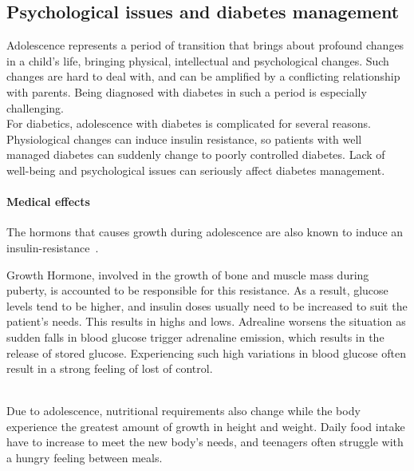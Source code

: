 \subsection{Psychological issues and diabetes management}

Adolescence represents a period of transition that brings about %
profound changes in a child's life, bringing physical, intellectual and psychological changes. Such changes are hard to deal with, and can be amplified by a conflicting relationship with parents. Being diagnosed with diabetes in such a period is especially challenging.
\\
For diabetics, adolescence with diabetes is complicated for several reasons. Physiological changes can induce insulin resistance, so patients with well managed diabetes can suddenly change to poorly controlled diabetes. Lack of well-being and psychological issues can seriously affect diabetes management. 
\\
\paragraph{Medical effects}
The hormons that causes growth during adolescence are also known to induce an insulin-resistance~\cite{HelpChildTeenTD1}.


Growth Hormone, involved in the growth of bone and muscle mass during puberty, is accounted to be responsible for this resistance. As a result, glucose levels tend to be higher, and insulin doses usually need to be increased to suit the patient's needs. 
This results in highs and lows. Adrealine worsens the situation as sudden falls in blood glucose trigger adrenaline emission, which results in the release of stored glucose. 
Experiencing such high variations in blood glucose often result in a strong feeling of lost of control.

\\
Due to adolescence, nutritional requirements also change while the body experience the greatest amount of growth in height and weight. Daily food intake have to increase to meet the new body's needs, and teenagers often struggle with a hungry feeling between meals.  


